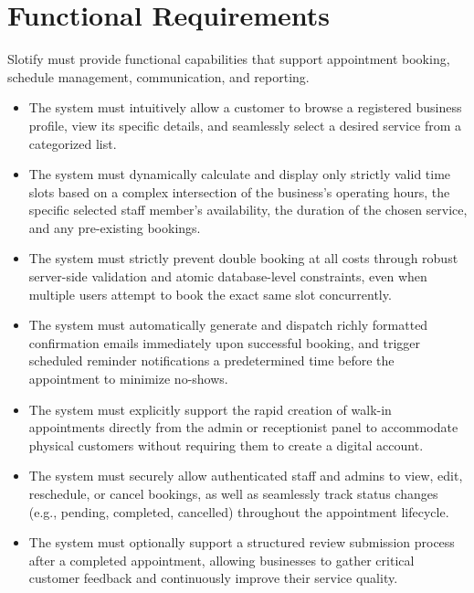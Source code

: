\section{Functional Requirements}
Slotify must provide functional capabilities that support appointment booking, schedule management, communication, and reporting.

\begin{itemize}
\item The system must intuitively allow a customer to browse a registered business profile, view its specific details, and seamlessly select a desired service from a categorized list.
\item The system must dynamically calculate and display only strictly valid time slots based on a complex intersection of the business's operating hours, the specific selected staff member's availability, the duration of the chosen service, and any pre-existing bookings.
\item The system must strictly prevent double booking at all costs through robust server-side validation and atomic database-level constraints, even when multiple users attempt to book the exact same slot concurrently.
\item The system must automatically generate and dispatch richly formatted confirmation emails immediately upon successful booking, and trigger scheduled reminder notifications a predetermined time before the appointment to minimize no-shows.
\item The system must explicitly support the rapid creation of walk-in appointments directly from the admin or receptionist panel to accommodate physical customers without requiring them to create a digital account.
\item The system must securely allow authenticated staff and admins to view, edit, reschedule, or cancel bookings, as well as seamlessly track status changes (e.g., pending, completed, cancelled) throughout the appointment lifecycle.
\item The system must optionally support a structured review submission process after a completed appointment, allowing businesses to gather critical customer feedback and continuously improve their service quality.
\end{itemize}

